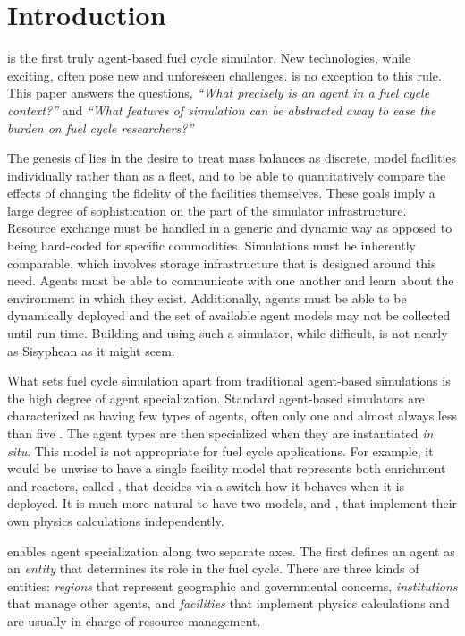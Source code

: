 \section{Introduction}
\label{sec-intro}

\Cyclus \cite{cyclus_v1_0,cyclus_v1_2} is the first truly agent-based 
\cite{jennings2000agent} fuel cycle simulator. 
New technologies, while exciting, often pose new and unforeseen challenges.
\Cyclus is no exception to this rule.  This paper answers the questions,
\emph{``What precisely is an agent in a fuel cycle context?''} and 
\emph{``What features of simulation can be abstracted away to ease the burden 
on fuel cycle researchers?''}

The genesis of \cyclus lies in the desire to 
treat mass balances as discrete, model facilities individually rather than as 
a fleet, and to be able to quantitatively compare the effects of changing the 
fidelity of the facilities themselves. These goals imply a large degree of 
sophistication on the part of the simulator infrastructure.  Resource exchange
must be handled in a generic and dynamic way as opposed to being hard-coded 
for specific commodities. Simulations must be inherently comparable, which involves 
storage infrastructure that is designed around this need. Agents must be able 
to communicate with one another and learn about the environment in which they 
exist. Additionally, agents must be able to be dynamically deployed and the set of 
available agent models may not be collected until run time. Building and using such a
simulator, while difficult, is not nearly as Sisyphean as it might seem. 

What sets fuel cycle simulation apart from traditional agent-based simulations 
is the high degree of agent specialization. Standard agent-based simulators
are characterized as having few types of agents, often only one and 
almost always less than five \cite{taylor2014agent}. The agent types are then 
specialized 
when they are instantiated \emph{in situ}. This model is not appropriate for 
fuel cycle applications.  For example, it would be unwise to have a single facility model 
that represents both enrichment and reactors, called ,
that decides via a switch how it behaves when it is deployed. It is much 
more natural to have two models,  and , 
that implement their own physics calculations independently.

\Cyclus enables agent specialization along two separate axes. The first defines 
an agent as an \emph{entity} that determines its role in the 
fuel cycle. There are three kinds of entities: \emph{regions} that 
represent geographic and governmental concerns, \emph{institutions} 
that manage other agents, and \emph{facilities} that implement 
physics calculations and are usually in charge of resource management.

